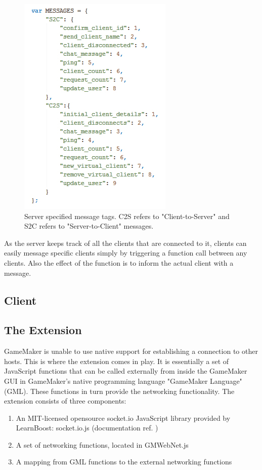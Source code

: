 \documentclass[bsc,frontabs,twoside,singlespacing,parskip,deptreport]{infthesis}     %
\begin{document}
\begin{figure}[H]
\includegraphics[scale=0.55]{images/server_message_tags.jpg}
\caption{Server specified message tags. C2S refers to "Client-to-Server" and S2C refers to "Server-to-Client" messages.}
\label{fig:server_message_tags}
\vspace{1em}
\end{figure}

As the server keeps track of all the clients that are connected to it, clients can easily message specific clients simply by triggering a function call between any clients. Also the effect of the function is to inform the actual client with a message.

\subsection{Client}
\subsection{The Extension}
GameMaker is unable to use native support for establishing a connection to other hosts. This is where the extension comes in play.
It is essentially a set of JavaScript functions that can be called externally from inside the GameMaker GUI in GameMaker's native programming language "GameMaker Language" (GML). These functions in turn provide the networking functionality.
The extension consists of three components:
\begin{enumerate}
\item An MIT-licensed opensource socket.io JavaScript library provided by LearnBoost: socket.io.js (documentation ref. \cite{socketiojs})
\item A set of networking functions, located in GMWebNet.js
\item A mapping from GML functions to the external networking functions
\end{enumerate}
\end{document}
